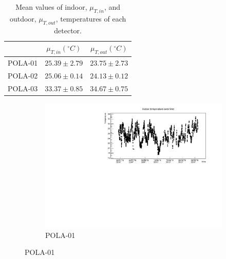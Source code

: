 \documentclass[12pt,a4paper]{amsart}
\begin{document}
\begin{table}[t]
\caption{Mean values of indoor, $\mu_{T, in}$, and outdoor, $\mu_{T, out}$, temperatures of each detector.}
\label{tab:temperatures}
\begin{tabular}{c|cc}
\hline
\hline
        & $\mu_{T, in} ({}^\circ \si{C})$ &$\mu_{T, out}({}^\circ \si{C})$ \\ \hline
POLA-01 & $25.39\pm 2.79$	& $23.75\pm 2.73$ \\
POLA-02 & $25.06\pm 0.14$    & $24.13\pm 0.12$ \\
POLA-03 & $33.37\pm 0.85$    & $34.67\pm 0.75$ \\
\hline \hline
\end{tabular}
\end{table}

\begin{figure}
\centering
	\begin{subfigure}[b]{\textwidth}
	\centering
		\includegraphics[width=\textwidth]{../data/plots/POLA-01/IndoorTemp_POLA-01.pdf}
		\caption{POLA-01}
		\label{fig:indoortemp_POLA-01}
	\end{subfigure}
	

\end{figure}
\end{document}
